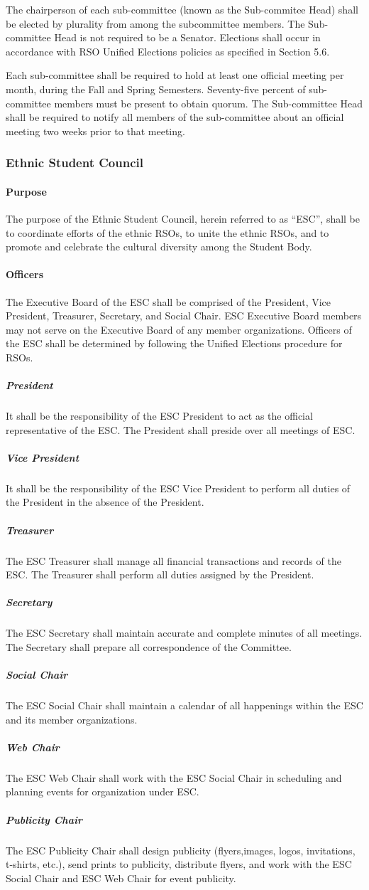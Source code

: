 \documentclass[12pt]{scrreprt}
\begin{document}
The chairperson of each sub-committee (known as the Sub-commitee Head) shall be elected by plurality from among the subcommittee members. The Sub-committee Head is not required to be a Senator. Elections shall occur in accordance with RSO Unified Elections policies as specified in Section 5.6.

Each sub-committee shall be required to hold at least one official
meeting per month, during the Fall and Spring Semesters. Seventy-five
percent of sub-committee members must be present to obtain quorum. The
Sub-committee Head shall be required to notify all members of the
sub-committee about an official meeting two weeks prior to that
meeting.

\subsubsection{Ethnic Student Council}

\paragraph{Purpose}
The purpose of the Ethnic Student Council, herein referred to as ``ESC'', 
shall be to coordinate efforts of the ethnic RSOs, to unite the ethnic RSOs, 
and to promote and celebrate the cultural diversity among the Student Body.

\paragraph{Officers}
The Executive Board of the ESC shall be comprised of the President, Vice 
President, Treasurer, Secretary, and Social Chair. ESC Executive Board members 
may not serve on the Executive Board of any member organizations. Officers of 
the ESC shall be determined by following the Unified Elections procedure for 
RSOs.
\subparagraph{President}
It shall be the responsibility of the ESC President to act as the official
representative of the ESC. The President shall preside over all meetings of 
ESC.
\subparagraph{Vice President}
It shall be the responsibility of the ESC Vice President to perform all duties 
of the President in the absence of the President.
\subparagraph{Treasurer}
The ESC Treasurer shall manage all financial transactions and records of the
ESC. The Treasurer shall perform all duties assigned by the President.
\subparagraph{Secretary}
The ESC Secretary shall maintain accurate and complete minutes of all
meetings. The Secretary shall prepare all correspondence of the Committee.
\subparagraph{Social Chair}
The ESC Social Chair shall maintain a calendar of all happenings within the 
ESC and its member organizations.
\subparagraph{Web Chair}
The ESC Web Chair shall work with the ESC Social Chair in scheduling and planning events for organization under ESC.
\subparagraph{Publicity Chair}
The ESC Publicity Chair shall design publicity (flyers,images, logos, invitations, t-shirts, etc.), send prints to publicity, distribute flyers, and work with the ESC Social Chair and ESC Web Chair for event publicity.
\end{document}
